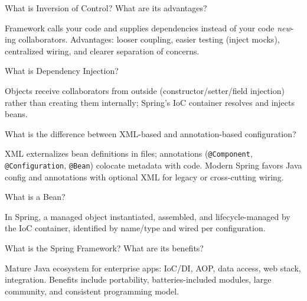 



\question[4]
What is Inversion of Control? What are its advantages?
\makeemptybox{1.45in}
\begin{solution}
  Framework calls your code and supplies dependencies instead of your code \emph{new}-ing collaborators. Advantages: looser coupling, easier testing (inject mocks), centralized wiring, and clearer separation of concerns.
\end{solution}

\question[4]
What is Dependency Injection?
\makeemptybox{1.2in}
\begin{solution}
  Objects receive collaborators from outside (constructor/setter/field injection) rather than creating them internally; Spring's IoC container resolves and injects beans.
\end{solution}

\question[4]
What is the difference between XML-based and annotation-based configuration?
\makeemptybox{1.35in}
\begin{solution}
  XML externalizes bean definitions in files; annotations (\texttt{@Component}, \texttt{@Configuration}, \texttt{@Bean}) colocate metadata with code. Modern Spring favors Java config and annotations with optional XML for legacy or cross-cutting wiring.
\end{solution}

\question[4]
What is a Bean?
\makeemptybox{1.05in}
\begin{solution}
  In Spring, a managed object instantiated, assembled, and lifecycle-managed by the IoC container, identified by name/type and wired per configuration.
\end{solution}

\question[4]
What is the Spring Framework? What are its benefits?
\makeemptybox{1.35in}
\begin{solution}
  Mature Java ecosystem for enterprise apps: IoC/DI, AOP, data access, web stack, integration. Benefits include portability, batteries-included modules, large community, and consistent programming model.
\end{solution}

